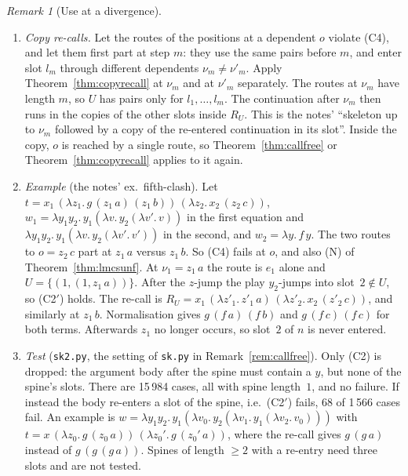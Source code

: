 \documentclass[11pt]{article}
\theoremstyle{plain}
\theoremstyle{definition}
\theoremstyle{remark}
\newtheorem{remark}[theorem]{Remark}
\begin{document}
\begin{remark}[Use at a divergence]\label{rem:copyrecall}
\begin{enumerate}
\item \emph{Copy re-calls.}  Let the routes of the positions at a
  dependent $o$ violate (C4), and let them first part at step $m$: they
  use the same pairs before $m$, and enter slot $l_m$ through different
  dependents $\nu_m\neq\nu'_m$.  Apply Theorem~\ref{thm:copyrecall} at
  $\nu_m$ and at $\nu'_m$ separately.  The routes at $\nu_m$ have length
  $m$, so $U$ has pairs only for $l_1,\dots,l_m$.  The continuation after
  $\nu_m$ then runs in the copies of the other slots inside $R_U$.  This
  is the notes' ``skeleton up to $\nu_m$ followed by a copy of the
  re-entered continuation in its slot''.  Inside the copy, $o$ is
  reached by a single route, so Theorem~\ref{thm:callfree} or
  Theorem~\ref{thm:copyrecall} applies to it again.
\item \emph{Example} (the notes' ex.~fifth-clash).  Let
  $t=x_1\,(\lambda z_1.\,g\,(z_1\,a)\,(z_1\,b))\,(\lambda z_2.\,x_2\,(z_2\,c))$,
  $w_1=\lambda y_1y_2.\,y_1(\lambda v.\,y_2(\lambda v'.\,v))$ in the first
  equation and $\lambda y_1y_2.\,y_1(\lambda v.\,y_2(\lambda v'.\,v'))$ in
  the second, and $w_2=\lambda y.\,f\,y$.  The two routes to
  $o=z_2\,c$ part at $z_1\,a$ versus $z_1\,b$.  So (C4) fails at $o$, and
  also (N) of Theorem~\ref{thm:lmcsunf}.  At $\nu_1=z_1\,a$ the route is
  $e_1$ alone and $U=\{(1,(1,z_1\,a))\}$.  After the $z$-jump the play
  $y_2$-jumps into slot~$2\notin U$, so (C2$'$) holds.  The re-call is
  $R_U=x_1\,(\lambda z'_1.\,z'_1\,a)\,(\lambda z'_2.\,x_2\,(z'_2\,c))$,
  and similarly at $z_1\,b$.  Normalisation gives $g\,(f\,a)\,(f\,b)$ and
  $g\,(f\,c)\,(f\,c)$ for both terms.  Afterwards $z_1$ no longer occurs,
  so slot~$2$ of $n$ is never entered.
\item \emph{Test} (\texttt{sk2.py}, the setting of \texttt{sk.py} in
  Remark~\ref{rem:callfree}).  Only (C2) is dropped: the argument body
  after the spine must contain a $y$, but none of the spine's slots.
  There are 15\,984 cases, all with spine length~$1$, and no failure.  If
  instead the body re-enters a slot of the spine, i.e.\ (C2$'$) fails, 68
  of 1\,566 cases fail.  An example is
  $w=\lambda y_1y_2.\,y_1(\lambda v_0.\,y_2(\lambda v_1.\,y_1(\lambda
  v_2.\,v_0)))$ with $t=x\,(\lambda z_0.\,g\,(z_0\,a))\,(\lambda
  z_0'.\,g\,(z_0'\,a))$, where the re-call gives $g\,(g\,a)$ instead of
  $g\,(g\,(g\,a))$.  Spines of length $\ge 2$ with a re-entry need three
  slots and are not tested.

\end{enumerate}
\end{remark}
\end{document}
